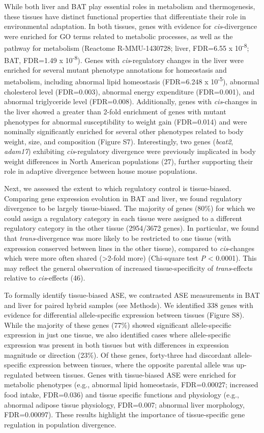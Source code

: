 \documentclass[9pt,twocolumn,twoside,lineno]{pnas-new}
\begin{document}
While both liver and BAT play essential roles in metabolism and
thermogenesis, these tissues have distinct functional properties that
differentiate their role in environmental adaptation. In both tissues,
genes with evidence for \emph{cis}-divergence were enriched for GO terms
related to metabolic processes, as well as the pathway for metabolism
(Reactome R-MMU-1430728; liver, FDR=6.55 x 10\textsuperscript{-8}; BAT,
FDR=1.49 x 10\textsuperscript{-8}). Genes with \emph{cis}-regulatory
changes in the liver were enriched for several mutant phenotype
annotations for homeostasis and metabolism, including abnormal lipid
homeostasis (FDR=6.248 x 10\textsuperscript{-5}), abnormal cholesterol
level (FDR=0.003), abnormal energy expenditure (FDR=0.001), and abnormal
triglyceride level (FDR=0.008). Additionally, genes with
\emph{cis}-changes in the liver showed a greater than 2-fold enrichment
of genes with mutant phenotypes for abnormal susceptibility to weight
gain (FDR=0.014) and were nominally significantly enriched for several
other phenotypes related to body weight, size, and composition (Figure
S7). Interestingly, two genes (\emph{bcat2}, \emph{adam17}) exhibiting
\emph{cis}-regulatory divergence were previously implicated in body
weight differences in North American populations (27), further
supporting their role in adaptive divergence between house mouse
populations.

Next, we assessed the extent to which regulatory control is
tissue-biased. Comparing gene expression evolution in BAT and liver, we
found regulatory divergence to be largely tissue-biased. The majority of
genes (80\%) for which we could assign a regulatory category in each
tissue were assigned to a different regulatory category in the other
tissue (2954/3672 genes). In particular, we found that
\emph{trans}-divergence was more likely to be restricted to one tissue
(with expression conserved between lines in the other tissue), compared
to \emph{cis}-changes which were more often shared (\textgreater2-fold
more) (Chi-square test \emph{P} \textless{} 0.0001). This may reflect
the general observation of increased tissue-specificity of
\emph{trans}-effects relative to \emph{cis}-effects (46).

To formally identify tissue-biased ASE, we contrasted ASE measurements
in BAT and liver for paired hybrid samples (see Methods). We identified
338 genes with evidence for differential allele-specific expression
between tissues (Figure S8). While the majority of these genes (77\%)
showed significant allele-specific expression in just one tissue, we
also identified cases where allele-specific expression was present in
both tissues but with differences in expression magnitude or direction
(23\%). Of these genes, forty-three had discordant allele-specific
expression between tissues, where the opposite parental allele was
up-regulated between tissues. Genes with tissue-biased ASE were enriched
for metabolic phenotypes (e.g., abnormal lipid homeostasis, FDR=0.00027;
increased food intake, FDR=0.036) and tissue specific functions and
physiology (e.g., abnormal adipose tissue physiology, FDR=0.007;
abnormal liver morphology, FDR=0.00097). These results highlight the
importance of tissue-specific gene regulation in population divergence.
\end{document}
